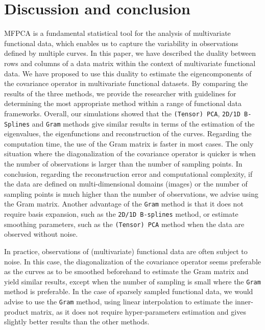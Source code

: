 \section{Discussion and conclusion} %
\label{sec:discussion}

MFPCA is a fundamental statistical tool for the analysis of multivariate functional data, which enables us to capture the variability in observations defined by multiple curves. In this paper, we have described the duality between rows and columns of a data matrix within the context of multivariate functional data. We have proposed to use this duality to estimate the eigencomponents of the covariance operator in multivariate functional datasets. By comparing the results of the three methods, we provide the researcher with guidelines for determining the most appropriate method within a range of functional data frameworks. 
Overall, our simulations showed that the \texttt{(Tensor) PCA}, \texttt{2D/1D B-Splines} and \texttt{Gram} methods give similar results in terms of the estimation of the eigenvalues, the eigenfunctions and reconstruction of the curves. Regarding the computation time, the use of the Gram matrix is faster in most cases. The only situation where the diagonalization of the covariance operator is quicker is when the number of observations is larger than the number of sampling points.
In conclusion, regarding the reconstruction error and computational complexity, if the data are defined on multi-dimensional domains (images) or the number of sampling points is much higher than the number of observations, we advise using the Gram matrix. Another advantage of the \texttt{Gram} method is that it does not require basis expansion, such as the \texttt{2D/1D B-splines} method, or estimate smoothing parameters, such as the \texttt{(Tensor) PCA} method when the data are observed without noise.

In practice, observations of (multivariate) functional data are often subject to noise. In this case, the diagonalization of the covariance operator seems preferable as the curves as to be smoothed beforehand to estimate the Gram matrix and yield similar results, except when the number of sampling is small where the \texttt{Gram} method is preferable. In the case of sparsely sampled functional data, we would advise to use the \texttt{Gram} method, using linear interpolation to estimate the inner-product matrix, as it does not require hyper-parameters estimation and gives slightly better results than the other methods.

